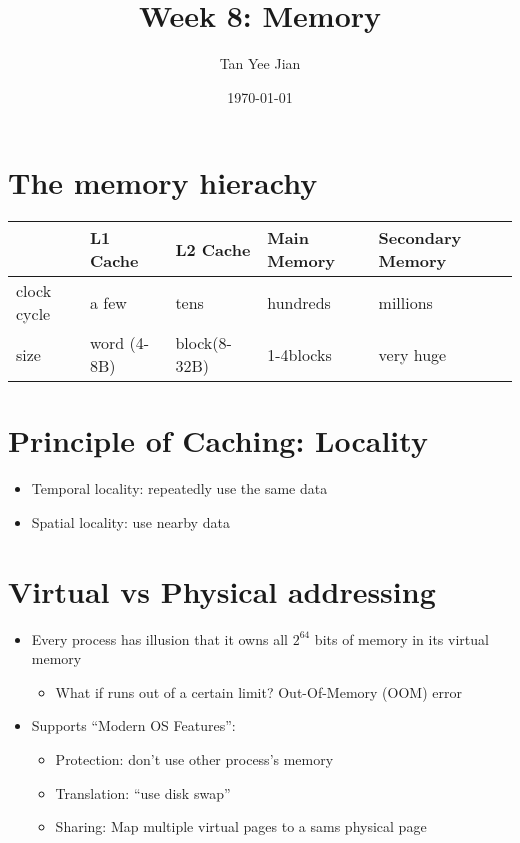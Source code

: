 \documentclass[11pt]{article}
\author{Tan Yee Jian}
\date{\today}
\title{Week 8: Memory}
\begin{document}
\maketitle
\tableofcontents

\section{The memory hierachy}
\label{sec:org869e480}
\begin{center}
\begin{tabular}{lllll}
 & L1 Cache & L2 Cache & Main Memory & Secondary Memory\\
\hline
clock cycle & a few & tens & hundreds & millions\\
size & word (4-8B) & block(8-32B) & 1-4blocks & very huge\\
\end{tabular}
\end{center}
\section{Principle of Caching: Locality}
\label{sec:org215dd61}
\begin{itemize}
\item Temporal locality: repeatedly use the same data
\item Spatial locality: use nearby data
\end{itemize}
\section{Virtual vs Physical addressing}
\label{sec:orgd91745f}
\begin{itemize}
\item Every process has illusion that it owns all \(2^{64}\) bits of memory in its
virtual memory
\begin{itemize}
\item What if runs out of a certain limit? Out-Of-Memory (OOM) error
\end{itemize}
\item Supports ``Modern OS Features'':
\begin{itemize}
\item Protection: don't use other process's memory
\item Translation: ``use disk swap''
\item Sharing: Map multiple virtual pages to a sams physical page
\end{itemize}
\end{itemize}
\end{document}
